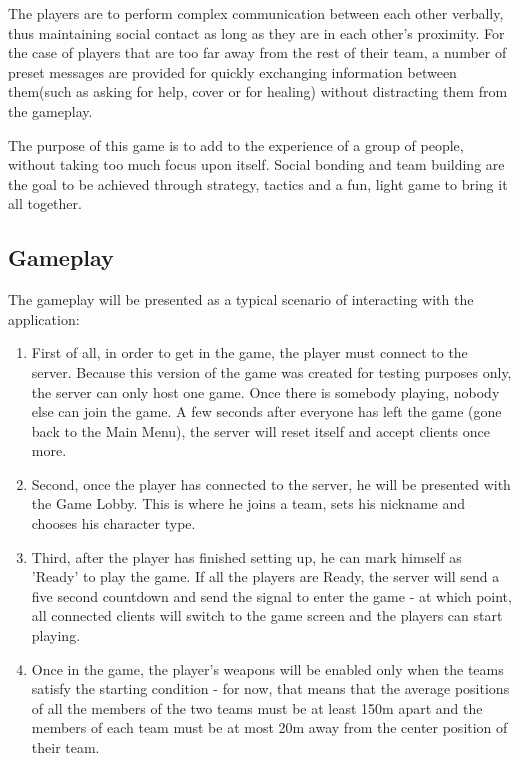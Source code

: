 The players are to perform complex communication between each other verbally,
thus maintaining social contact as long as they are in each other's proximity.
For the case of players that are too far away from the rest of their team, a
number of preset messages are provided for quickly exchanging information
between them(such as asking for help, cover or for healing) without distracting
them from the gameplay.\newline

The purpose of this game is to add to the experience of a group of people,
without taking too much focus upon itself. Social bonding and team building are
the goal to be achieved through strategy, tactics and a fun, light game to bring
it all together.\newline

\subsection{Gameplay}

The gameplay will be presented as a typical scenario of interacting with the
application:

\begin{enumerate}
  \item First of all, in order to get in the game, the player must connect to
  the server. Because this version of the game was created for testing purposes
  only, the server can only host one game. Once there is somebody playing,
  nobody else can join the game. A few seconds after everyone has left the game
  (gone back to the Main Menu), the server will reset itself and accept clients
  once more.
  
  \item Second, once the player has connected to the server, he will be
  presented with the Game Lobby. This is where he joins a team, sets his
  nickname and chooses his character type.

  \item Third, after the player has finished setting up, he can mark himself as
  'Ready' to play the game. If all the players are Ready, the server will send a
  five second countdown and send the signal to enter the game - at which point,
  all connected clients will switch to the game screen and the players can
  start playing.
  
  \item Once in the game, the player's weapons will be enabled only when the
  teams satisfy the starting condition - for now, that means that the average
  positions of all the members of the two teams must be at least 150m apart and
  the members of each team must be at most 20m away from the center position of
  their team.
 
\end{enumerate}

